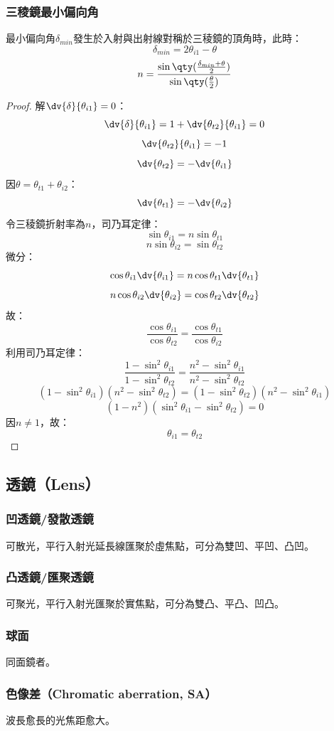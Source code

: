 \documentclass[a4paper,12pt]{report}
\begin{document}
\subsubsection{三稜鏡最小偏向角}
最小偏向角$\delta_{min}$發生於入射與出射線對稱於三稜鏡的頂角時，此時：
\[\delta_{min}=2\theta_{i1}-\theta\]
\[n=\frac{\sin\qty(\frac{\delta_{min}+\theta}{2})}{\sin\qty(\frac{\theta}{2})}\]
\begin{proof}
解$\dv{\delta}{\theta_{i1}}=0$：
\[\dv{\delta}{\theta_{i1}}=1+\dv{\theta_{t2}}{\theta_{i1}}=0\]
\[\dv{\theta_{t2}}{\theta_{i1}}=-1\]
\[\dv{\theta_{t2}}=-\dv{\theta_{i1}}\]
因$\theta=\theta_{t1}+\theta_{i2}$：
\[\dv{\theta_{t1}}=-\dv{\theta_{i2}}\]
令三稜鏡折射率為$n$，司乃耳定律：
\[\sin\theta_{i1}=n\sin\theta_{t1}\]
\[n\sin\theta_{i2}=\sin\theta_{t2}\]
微分：
\[\cos\theta_{i1}\dv{\theta_{i1}}=n\cos\theta_{t1}\dv{\theta_{t1}}\]
\[n\cos\theta_{i2}\dv{\theta_{i2}}=\cos\theta_{t2}\dv{\theta_{t2}}\]
故：
\[\frac{\cos\theta_{i1}}{\cos\theta_{t2}}=\frac{\cos\theta_{t1}}{\cos\theta_{i2}}\]
利用司乃耳定律：
\[\frac{1-\sin^2\theta_{i1}}{1-\sin^2\theta_{t2}}=\frac{n^2-\sin^2\theta_{i1}}{n^2-\sin^2\theta_{t2}}\]
\[(1-\sin^2\theta_{i1})(n^2-\sin^2\theta_{t2})=(1-\sin^2\theta_{t2})(n^2-\sin^2\theta_{i1})\]
\[(1-n^2)(\sin^2\theta_{i1}-\sin^2\theta_{t2})=0\]
因$n\neq 1$，故：
\[\theta_{i1}=\theta_{t2}\]
\end{proof}
\subsection{透鏡（Lens）}
\subsubsection{凹透鏡/發散透鏡}
可散光，平行入射光延長線匯聚於虛焦點，可分為雙凹、平凹、凸凹。
\subsubsection{凸透鏡/匯聚透鏡}
可聚光，平行入射光匯聚於實焦點，可分為雙凸、平凸、凹凸。
\subsubsection{球面}
同面鏡者。
\subsubsection{色像差（Chromatic aberration, SA）}
波長愈長的光焦距愈大。
\end{document}

